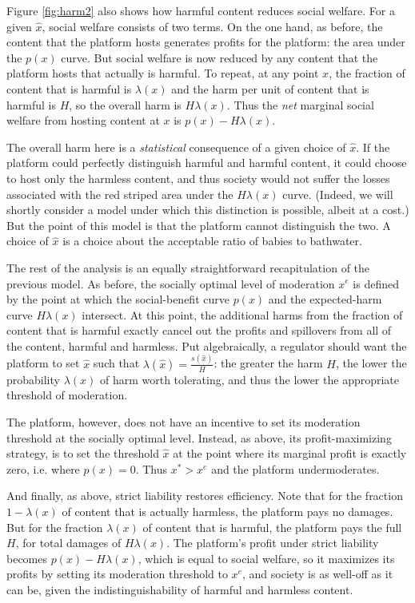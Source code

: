 Figure \ref{fig:harm2} also shows how harmful content reduces social welfare. For a given $\hat{x}$, social welfare consists of two terms. On the one hand, as before, the content that the platform hosts generates profits for the platform: the area under the $p(x)$ curve. But social welfare is now reduced by any content that the platform hosts that actually is harmful. To repeat, at any point $x$, the fraction of content that is harmful is $\lambda(x)$ and the harm per unit of content that is harmful is $H$, so the overall harm is $H\lambda(x)$. Thus the \emph{net} marginal social welfare from hosting content at $x$ is $p(x) - H\lambda(x)$.

The overall harm here is a \emph{statistical} consequence of a given choice of $\hat{x}$. If the platform could perfectly distinguish harmful and harmful content, it could choose to host only the harmless content, and thus society would not suffer the losses associated with the red striped area under the $H\lambda(x)$ curve. (Indeed, we will shortly consider a model under which this distinction is possible, albeit at a cost.) But the point of this model is that the platform cannot distinguish the two. A choice of $\hat{x}$ is a choice about the acceptable ratio of babies to bathwater.

The rest of the analysis is an equally straightforward recapitulation of the previous model. As before, the socially optimal level of moderation $x^e$ is defined by the point at which the social-benefit curve $p(x)$ and the expected-harm curve $H\lambda(x)$ intersect. At this point, the additional harms from the fraction of content that is harmful exactly cancel out the profits and spillovers from all of the content, harmful and harmless. Put algebraically, a regulator should want the platform to set $\hat{x}$ such that $\lambda(\hat{x}) = \frac{s(\hat{x})}{H}$: the greater the harm $H$, the lower the probability $\lambda(x)$ of harm worth tolerating, and thus the lower the appropriate threshold of moderation.

The platform, however, does not have an incentive to set its moderation threshold at the socially optimal level. Instead, as above, its profit-maximizing strategy, is to set the threshold $\hat{x}$ at the point where its marginal profit is exactly zero, i.e. where $p(x) = 0$. Thus $x^* > x^e$ and the platform undermoderates.

And finally, as above, strict liability restores efficiency. Note that for the fraction $1 - \lambda(x)$ of content that is actually harmless, the platform pays no damages. But for the fraction $\lambda(x)$ of content that is harmful, the platform pays the full $H$, for total damages of $H\lambda(x)$. The platform's profit under strict liability becomes $p(x) - H\lambda(x)$, which is equal to social welfare, so it maximizes its profits by setting its moderation threshold to $x^e$, and society is as well-off as it can be, given the indistinguishability of harmful and harmless content.


